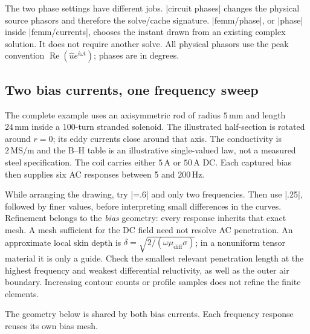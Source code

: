 The two phase settings have different jobs. |circuit phases| changes the
physical source phasors and therefore the solve/cache signature.
|femm/phase|, or |phase| inside |femm/currents|, chooses the instant drawn from
an existing complex solution. It does not require another solve. All physical
phasors use the peak convention $\operatorname{Re}(\widehat u e^{i\omega t})$;
phases are in degrees.

\subsection{Two bias currents, one frequency sweep}
The complete example uses an axisymmetric rod of radius $5\,\mathrm{mm}$ and
length $24\,\mathrm{mm}$ inside a 100-turn stranded solenoid. The illustrated
half-section is rotated around $r=0$; its eddy currents close around that axis.
The conductivity is $2\,\mathrm{MS/m}$ and the B--H table is an illustrative
single-valued law, not a measured steel specification. The coil carries either
$5\,\mathrm A$ or $50\,\mathrm A$ DC. Each captured bias then supplies six
AC responses between 5 and $200\,\mathrm{Hz}$.

While arranging the drawing, try |\CoreMesh=.6| and only two frequencies.
Then use |.25|, followed by finer values, before interpreting small differences
in the curves. Refinement belongs to the \emph{bias} geometry: every response
inherits that exact mesh. A mesh sufficient for the DC field need not resolve
AC penetration. An approximate local skin depth is
$\delta=\sqrt{2/(\omega\mu_{\mathrm{diff}}\sigma)}$; in a nonuniform tensor
material it is only a guide. Check the smallest relevant penetration length
at the highest frequency and weakest differential reluctivity, as well as the
outer air boundary. Increasing contour counts or profile samples does not
refine the finite elements.


The geometry below is shared by both bias currents. Each frequency response reuses its own bias mesh.


